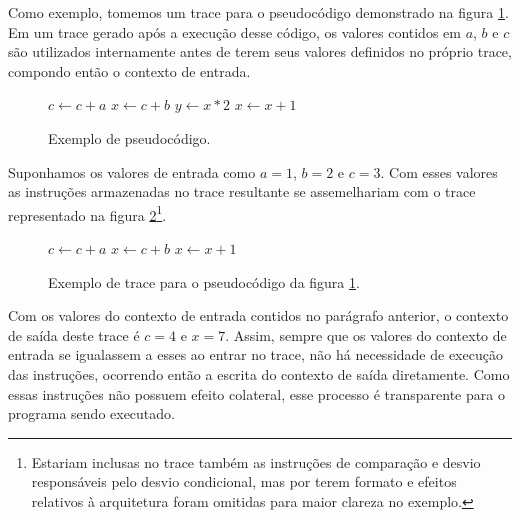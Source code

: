Como exemplo, tomemos um trace para o pseudocódigo demonstrado na figura \ref{Fig:ExemploContexto1}. Em um trace gerado após a execução desse código, os valores contidos em $a$, $b$ e $c$ são utilizados internamente antes de terem seus valores definidos no próprio trace, compondo então o contexto de entrada.

\begin{figure}[!h]
	\label{Fig:ExemploContexto1}
	\caption[Exemplo de pseudocódigo]{
		Exemplo de pseudocódigo.}
	
		\begin{algorithmic}
			\STATE $c \leftarrow c + a$
			\STATE $x \leftarrow c + b$
			\STATE $y \leftarrow x * 2$
			\ELSE
			\STATE $x \leftarrow x + 1$
			\ENDIF
		\end{algorithmic}
	\legend{Fonte: elaborada pelo autor}
\end{figure}

Suponhamos os valores de entrada como $a = 1$, $b = 2$ e $c = 3$. Com esses valores as instruções armazenadas no trace resultante se assemelhariam com o trace representado na figura \ref{Fig:ExemploContexto2}\footnote{Estariam inclusas no trace também as instruções de comparação e desvio responsáveis pelo desvio condicional, mas por terem formato e efeitos relativos à arquitetura foram omitidas para maior clareza no exemplo.}. 

\begin{figure}[!h]
	\label{Fig:ExemploContexto2}
	\caption[Exemplo de trace para o pseudocódigo da figura \ref{Fig:ExemploContexto1}]{
		Exemplo de trace para o pseudocódigo da figura \ref{Fig:ExemploContexto1}.}
	
	\begin{algorithmic}
		\STATE $c \leftarrow c + a$
		\STATE $x \leftarrow c + b$
		\STATE $x \leftarrow x + 1$
	\end{algorithmic}
\end{figure}

Com os valores do contexto de entrada contidos no parágrafo anterior, o contexto de saída deste trace é $c = 4$ e $x = 7$. Assim, sempre que os valores do contexto de entrada se igualassem a esses ao entrar no trace, não há necessidade de execução das instruções, ocorrendo então a escrita do contexto de saída diretamente. Como essas instruções não possuem efeito colateral, esse processo é transparente para o programa sendo executado.

